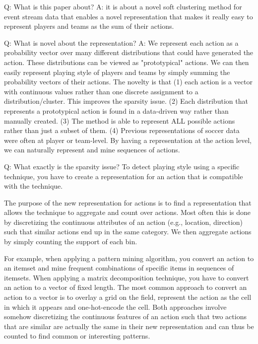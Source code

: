 \documentclass[runningheads]{llncs}
\begin{document}




Q: What is this paper about?
A: it is about a novel soft clustering method for event stream data that enables a novel representation that makes it really easy to represent players and teams as the sum of their actions.


Q: What is novel about the representation?
A: We represent each action as a probability vector over many different distributions that could have generated the action. These distributions can be viewed as "prototypical" actions. We can then easily represent playing style of players and teams by simply summing the probability vectors of their actions. The novelty is that (1) each action is a vector with continuous values rather than one discrete assignment to a distribution/cluster. This improves the sparsity issue. (2) Each distribution that represents a prototypical action is found in a data-driven way rather than manually created. (3) The method is able to represent ALL possible actions rather than just a subset of them. (4) Previous representations of soccer data were often at player or team-level. By having a representation at the action level, we can naturally represent and mine sequences of actions.

Q: What exactly is the sparsity issue?
To detect playing style using a specific technique, you have to create a representation for an action that is compatible with the technique.

The purpose of the new representation for actions is to find a representation that allows the technique to aggregate and count over actions. Most often this is done by discretizing the continuous attributes of an action (e.g., location, direction) such that similar actions end up in the same category. We then aggregate actions by simply counting the support of each bin.

For example, when applying a pattern mining algorithm, you convert an action to an itemset and mine frequent combinations of specific items in sequences of itemsets.
When applying a matrix decomposition technique, you have to convert an action to a vector of fixed length. The most common approach to convert an action to a vector is to overlay a grid on the field, represent the action as the cell in which it appears and one-hot-encode the cell. Both approaches involve somehow discretizing the continuous features of an action such that two actions that are similar are actually the same in their new representation and can thus be counted to find common or interesting patterns.
\end{document}
